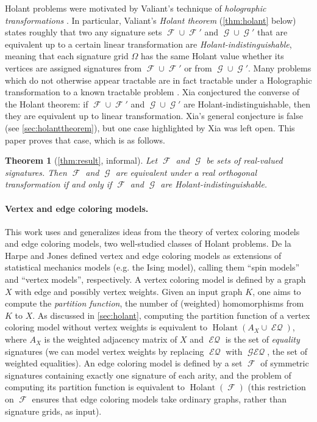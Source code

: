 \documentclass{article}
\newtheorem*{theorem*}{Theorem}
\theoremstyle{remark}
\theoremstyle{definition}
\DeclareMathOperator{\fc}{\mathcal{F}}
\DeclareMathOperator{\gc}{\mathcal{G}}
\DeclareMathOperator{\holant}{Holant}
\DeclareMathOperator{\eq}{\mathcal{EQ}}
\DeclareMathOperator{\geneq}{\mathcal{GEQ}}
\begin{document}
Holant problems were motivated by Valiant's technique of \emph{holographic
transformations} \cite{valiant}. In particular, Valiant's \emph{Holant theorem} (\autoref{thm:holant}
below) states roughly that two any signature sets $\fc \cup \fc'$ and $\gc \cup \gc'$ that are 
equivalent up to a certain 
linear transformation are \emph{Holant-indistinguishable}, meaning that each signature grid $\Omega$
has the same Holant value whether its vertices are assigned signatures from $\fc \cup \fc'$ or from 
$\gc \cup \gc'$.
Many problems which do not otherwise appear tractable are in fact tractable under a Holographic
transformation to a known tractable problem \cite{valiant_2006_accidental}.
Xia \cite{xia} conjectured the converse of the Holant theorem: if $\fc \cup \fc'$ and
$\gc \cup \gc'$ are Holant-indistinguishable, then they are equivalent up to linear transformation.
Xia's general conjecture is false (see \autoref{sec:holanttheorem}), but one case highlighted
by Xia was left open. This paper proves that case, which is as follows.
\begin{theorem*}[\autoref{thm:result}, informal]
    Let $\fc$ and $\gc$ be sets of real-valued signatures. Then $\fc$ and $\gc$ are equivalent under
    a real orthogonal transformation if and only if $\fc$ and $\gc$ are Holant-indistinguishable.
\end{theorem*}

\paragraph{Vertex and edge coloring models.}
This work uses and generalizes ideas from the theory of vertex coloring models and edge coloring models,
two well-studied classes of Holant problems.
De la Harpe and Jones \cite{jones} defined vertex and edge coloring models as extensions of 
statistical mechanics models (e.g. the Ising model), calling them ``spin models'' and ``vertex models'',
respectively. A vertex coloring model is defined by a graph $X$ with edge and possibly vertex
weights. Given an input graph $K$, one aims to compute the \emph{partition function}, the number of 
(weighted) homomorphisms from $K$ to $X$.
As discussed in \autoref{sec:holant}, computing the partition function of a vertex coloring model
without vertex weights is equivalent to $\holant(A_X \cup \eq)$, where
$A_X$ is the weighted adjacency matrix of $X$ and $\eq$ is the set of \emph{equality} signatures 
(we can model vertex weights by replacing $\eq$ with $\geneq$, the set of weighted equalities).
An edge coloring model is defined by a set $\fc$ of symmetric signatures containing exactly
one signature of each arity, and the problem of computing its partition function is equivalent to 
$\holant(\fc)$ (this restriction on $\fc$ ensures that
edge coloring models take ordinary graphs, rather than signature grids, as input).
\end{document}
